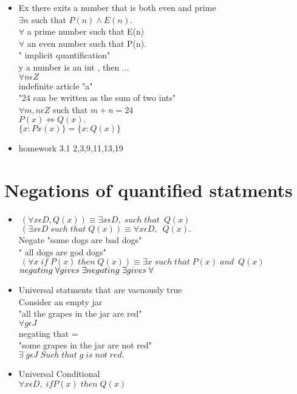 \documentclass[10pt,letterpaper]{report}
\begin{document}
\begin{itemize}
\item Ex there exits a number that is both even and prime  \\ $\exists n $ such that $P(n) \wedge E(n).$ \\ $\forall $ a prime number such that E(n) \\ $\forall $ an even number such that P(n). \\ " implicit quantification" \\ y a number is an int , then ... \\ $\forall n \epsilon Z $ \\ indefinite article "a" \\ "24 can be written as the sum of two ints" \\ $\forall m, n \epsilon Z $ such that $m + n = 24$ \\ $P(x) \Leftrightarrow Q(x). $\\ $ \{x \colon Px(x)\} = \{ x \colon Q(x) \}  $ 

\item homework 3.1 2,3,9,11,13,19
\end{itemize}
\section{Negations of quantified statments}
\begin{itemize}
\item $ ~( \forall x \epsilon D , Q(x)) \equiv \exists x \epsilon D , \; such \; that \; ~ Q(x)$ \\ $~(\exists x \epsilon D \; such \; that \; Q(x)) \equiv \forall x \epsilon D, \; ~Q(x).$ \\Negate "some dogs are bad dogs" \\ " all dogs are god dogs" \\ $~( \forall x \; if \; P(x) \; then \; Q(x)) \equiv \exists x \; such \; that \; P(x) \; and \; ~Q(x)$ \\ $ negating \; \forall \\ gives \; \exists \\ negating \; \exists \\ gives \; \forall $
\pagebreak
\item Universal statments that are vacuously true \\ Consider an empty jar \\"all the grapes in the jar are red" \\ $ \forall g \epsilon J$ \\ negating that = \\ "some grapes in the jar are not red" \\ $ \exists \; g \epsilon J \; Such \; that \; g \; is \; not \; red.$
\item Universal Conditional \\ $\forall x \epsilon D , \; if P(x)\; then \; Q(x) $ 

\end{itemize}
\end{document}
